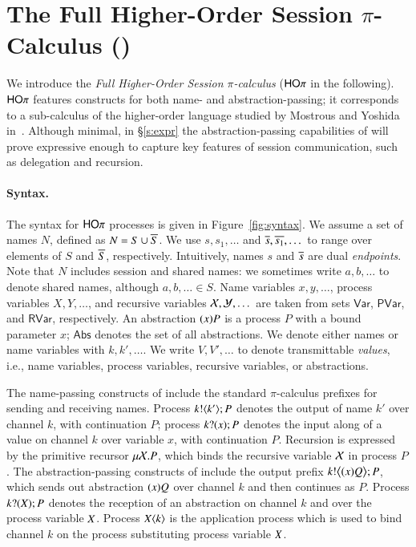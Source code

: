 \section{The Full Higher-Order Session $\pi$-Calculus (\HOp)}

We introduce the {\em Full Higher-Order Session $\pi$-calculus} ($\mathsf{HO}\pi$ in the following).
$\mathsf{HO}\pi$ features constructs for both name- and abstraction-passing; it corresponds to a sub-calculus 
of the higher-order language studied by Mostrous and Yoshida in~\cite{tlca07}.
Although minimal, 
in \S\ref{s:expr}
the abstraction-passing capabilities of \HOp will prove 
expressive enough to capture key features of session communication, 
such as delegation and recursion.

\paragraph{Syntax.}

The syntax for $\mathsf{HO}\pi$ processes is given in Figure~\ref{fig:syntax}.
We assume a set of names $N$, defined as $N = S \cup \overline{S}$.
We use $s, s_1, \dots$ 
and $\overline{s}, \overline{s_1}, \dots$
to range over elements of $S$ and $\overline{S}$, respectively.
Intuitively, names $s$ and $\overline{s}$ are dual \emph{endpoints}.
Note that $N$ includes session and shared names:
we sometimes write  $a,b, \dots$ to denote shared names, although $a, b, \dots \in S$.
Name variables $x, y,  \dots$, 
process variables $X, Y,  \dots$,
and recursive variables $\mathcal{X}, \mathcal{Y}, \dots$ 
are taken from sets $\mathsf{Var}$, $\mathsf{PVar}$, and $\mathsf{RVar}$, respectively. 
An abstraction $(x)P$ is a process $P$ with a bound parameter $x$;
$\mathsf{Abs}$ denotes the set of all abstractions.
We denote either names or name variables with $k, k', \dots$.
We write $V, V', \ldots$ to denote 
transmittable \emph{values}, i.e., 
name variables, process variables, recursive variables, or abstractions.

The name-passing constructs of \HOp include the standard $\pi$-calculus prefixes for sending and receiving names.
Process $k ! \langle k' \rangle ; P$ denotes the output of name $k'$ over channel $k$, with continuation $P$;
process $k ? (x) ; P$ denotes the input along  of a value
on channel $k$ over variable $x$, with continuation $P$. 
Recursion is expressed by the primitive recursor $\mu \mathcal{X}. P$, which binds the recursive variable $\mathcal{X}$ in process $P$. The abstraction-passing constructs of \HOp include 
the output prefix $k ! \big\langle (x)Q \big\rangle ; P$, which 
sends out abstraction $(x)Q$ over channel $k$ and then continues as $P$. 
Process $k ? (X) ; P$ denotes the reception of an abstraction
on channel $k$ and over the process variable $X$. Process $X\langle k \rangle$ is the application
process which is used to bind channel $k$ on the process substituting process variable $X$.

